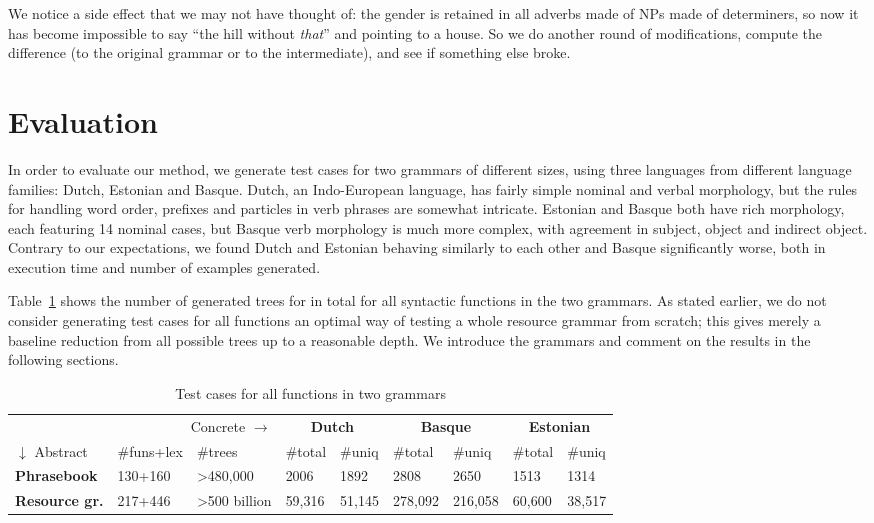 \documentclass[11pt]{article}
\begin{document}
\noindent We notice a side effect that we may not have thought of: the
gender is retained in all adverbs made of NPs made of determiners, so
now it has become impossible to say ``the hill without \emph{that}'' and
pointing to a house. So we do another round of modifications, compute
the difference (to the original grammar or to the intermediate), and
see if something else broke.

\section{Evaluation}

In order to evaluate our method, we generate test cases for two
grammars of different sizes, using three languages from different
language families: Dutch, Estonian and Basque. Dutch, an Indo-European
language, has fairly simple nominal and verbal morphology, but the
rules for handling word order, prefixes and particles in verb phrases
are somewhat intricate. Estonian and Basque both have rich morphology,
each featuring 14 nominal cases, but Basque verb morphology is much
more complex, with agreement in subject, object and indirect
object. Contrary to our expectations, we found Dutch and Estonian
behaving similarly to each other and Basque significantly worse, both
in execution time and number of examples generated. 

Table~\ref{results} shows the number of generated trees for 
in total for all syntactic functions in the two grammars. 
As stated earlier, we do not consider generating test cases for all
functions an optimal way of testing a whole resource grammar from scratch;
this gives merely a baseline reduction from all possible trees up to a
reasonable depth. We introduce the grammars and comment on the results
in the following sections.

\begin{table}[h]
\centering
\begin{tabular}{|lll|ll|ll|ll|}
\hline
\multicolumn{3}{|r}{Concrete $\rightarrow$}              &
                                                                   \multicolumn{2}{|c}{\bf Dutch} & \multicolumn{2}{|c}{\bf Basque} & \multicolumn{2}{|c|}{\bf Estonian} \\
$\downarrow$ Abstract  & \#funs+lex & \#trees  &
                                                                 \#total & \#uniq & \#total & \#uniq  & \#total  & \#uniq \\ \hline
{\bf Phrasebook}       & 130+160         & \textgreater{}480,000       & 2006  & 1892   & 2808    & 2650    & 1513     & 1314   \\ \hline
{\bf Resource gr.} & 217+446         & \textgreater{}500 billion   & 59,316 & 51,145  & 278,092  & 216,058  & 60,600    & 38,517   \\ \hline
\end{tabular}
\caption{Test cases for all functions in two grammars}
\label{results}
\end{table}
\end{document}
